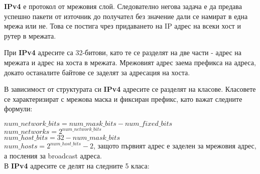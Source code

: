 \documentclass[fleqn,12pt]{article}
\begin{document}
\begin{flushleft}
\textbf{IPv4} е протокол от мрежовия слой. Следователно негова задача е да предава успешно пакети от източник до получател без значение дали се намират в една мрежа или не.
Това се постига чрез придаването на IP адрес на всеки хост и рутер в мрежата.

При \textbf{IPv4} адресите са 32-битови, като те се разделят на две части - адрес на мрежата и адрес на хоста в мрежата.
Мрежовият адрес заема префикса на адреса, докато останалите байтове се заделят за адресация на хоста.

В зависимост от структурата си \textbf{IPv4} адресите се разделят на класове. Класовете се характеризират с мрежова маска и фиксиран префикс, като важат следните формули:

$num\_network\_bits = num\_mask\_bits - num\_fixed\_bits$ \\
$num\_networks = 2^{num\_network\_bits}$ \\
$num\_host\_bits = 32 - num\_mask\_bits$ \\
$num\_hosts = 2^{num\_host\_bits} - 2$, защото първият адрес е заделен за мрежовия адрес, а посления за broadcast адреса. \\

В \textbf{IPv4} адресите се делят на следните 5 класа:


\end{flushleft}
\end{document}
